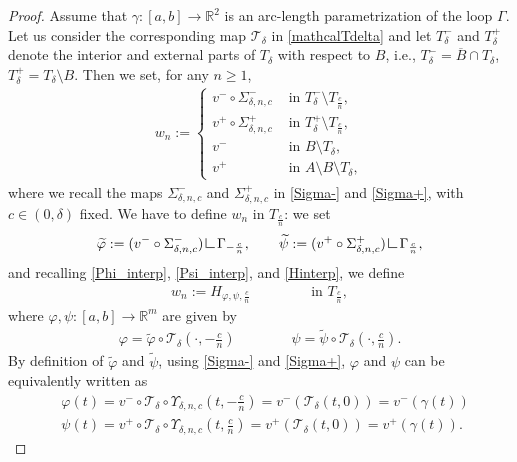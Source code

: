 \documentclass[10pt,a4paper]{amsart}
\newcommand{\R}{\mathbb{R}}
\newcommand{\res}      {\mathop{\hbox{\vrule height 7pt width .5pt depth
                        0pt\vrule height .5pt width 6pt depth 0pt}}\nolimits}
\begin{document}
\begin{proof}
	Assume  that  $\gamma:[a,b]\rightarrow \R^2$ is an arc-length parametrization of the loop $\Gamma$. Let us consider the corresponding map $\mathcal T_\delta$ in \eqref{mathcalTdelta} and let $T^-_\delta$ and $T^+_\delta$ denote the interior and external parts of $T_\delta$ with respect to $B$, i.e., $ T^-_\delta=\overline B\cap T_\delta$, $T^+_\delta=T_\delta\setminus B$. Then we set, for any $n\geq 1$,
	\begin{align}
		w_{n}:=\begin{cases}
			v^-\circ \Sigma_{\delta,n,c}^-&\text{ in }T^-_\delta\setminus T_{\frac cn},\\
			v^+\circ  \Sigma_{\delta,n,c}^+&\text{ in }T^+_\delta\setminus T_{\frac cn},\\
			v^-&\text{ in }B\setminus T_\delta,\\
			v^+&\text{ in }A\setminus B\setminus T_\delta,
		\end{cases}
	\end{align}
	where we recall the maps $\Sigma_{\delta,n,c}^-$ and $\Sigma_{\delta,n,c}^+$ in \eqref{Sigma-} and \eqref{Sigma+}, with $c\in (0,\delta)$ fixed.
	We have to define $w_{n}$ in $T_{\frac cn}$: we set 
	$$\widetilde\varphi:=(v^-\circ \Sigma_{\delta,n,c}^- )\res \Gamma_{-\frac cn},\qquad \widetilde\psi:=(v^+\circ \Sigma_{\delta,n,c}^+)\res \Gamma_{\frac cn},$$
	and 
	recalling \eqref{Phi_interp}, \eqref{Psi_interp}, and \eqref{Hinterp}, we define
	\begin{align}
		w_{n}:=H_{\varphi,\psi,\frac cn}\qquad \qquad \text{ in }T_{\frac cn},
	\end{align}
	where $\varphi,\psi:[a,b]\rightarrow \R^m$ are given by
	\begin{align}
		\varphi=\widetilde \varphi\circ \mathcal T_\delta (\cdot,-\frac cn) \qquad \qquad \psi=\widetilde \psi\circ \mathcal T_\delta (\cdot,\frac cn).
	\end{align}
	By definition of $\widetilde\varphi$ and $\widetilde\psi$, using \eqref{Sigma-} and \eqref{Sigma+}, $\varphi$ and $\psi$  can be equivalently written as 
	\begin{align*}
		&\varphi(t)=v^-\circ\mathcal T_\delta\circ \Upsilon_{\delta,n,c}(t,-\frac cn)=v^-(\mathcal T_\delta(t,0))=v^-(\gamma(t))\\
		&\psi(t)=v^+\circ\mathcal T_\delta\circ \Upsilon_{\delta,n,c}(t,\frac cn)=v^+(\mathcal T_\delta(t,0))=v^+(\gamma(t)).
	\end{align*}

\end{proof}
\end{document}

